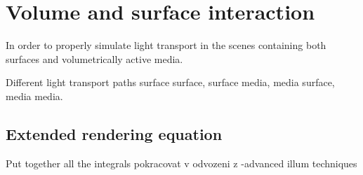\section{Volume and surface interaction}
In order to properly simulate light transport in the scenes containing both surfaces and volumetrically active media.

Different light transport paths surface surface, surface media, media surface, media media.

\subsection{Extended rendering equation}
Put together all the integrals
pokracovat v odvozeni z -advanced illum techniques





